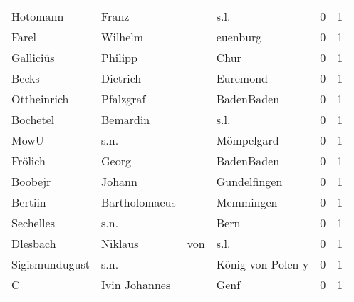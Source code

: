 \begin{center}
\begin{tiny}
\begin{longtabu}{llllrr}
                 Hotomann &                              Franz &             &                                        s.l. &          0 &         1 \\
                    Farel &                            Wilhelm &             &                                    euenburg &          0 &         1 \\
                Galliciüs &                            Philipp &             &                                        Chur &          0 &         1 \\
                    Becks &                           Dietrich &             &                                    Euremond &          0 &         1 \\
              Ottheinrich &                          Pfalzgraf &             &                                  BadenBaden &          0 &         1 \\
                 Bochetel &                           Bemardin &             &                                        s.l. &          0 &         1 \\
                     MowU &                               s.n. &             &                                  Mömpelgard &          0 &         1 \\
                  Frölich &                              Georg &             &                                  BadenBaden &          0 &         1 \\
                  Boobejr &                             Johann &             &                                Gundelfingen &          0 &         1 \\
                  Bertiin &                      Bartholomaeus &             &                                   Memmingen &          0 &         1 \\
                Sechelles &                               s.n. &             &                                        Bern &          0 &         1 \\
                 Dlesbach &                            Niklaus &         von &                                        s.l. &          0 &         1 \\
           Sigismundugust &                               s.n. &             &                           König von Polen y &          0 &         1 \\
                        C &                      Ivin Johannes &             &                                        Genf &          0 &         1 \\

\end{longtabu}
\end{tiny}
\end{center}
